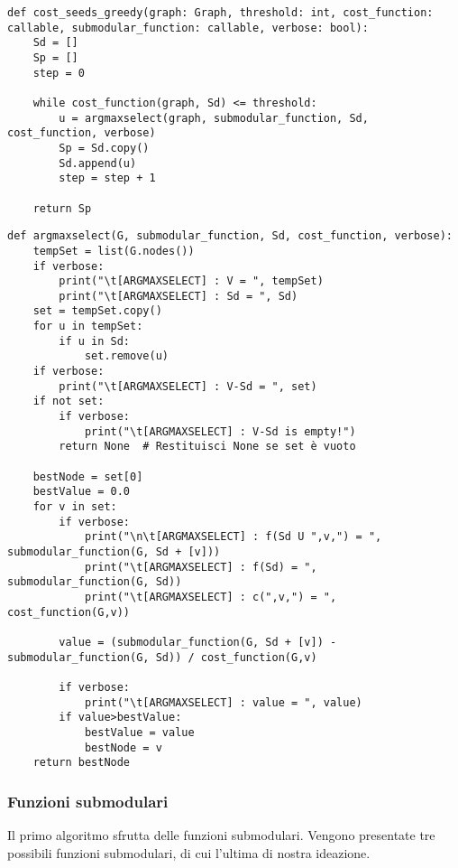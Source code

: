 \begin{code}
\begin{verbatim}
def cost_seeds_greedy(graph: Graph, threshold: int, cost_function: callable, submodular_function: callable, verbose: bool):
    Sd = []
    Sp = []
    step = 0

    while cost_function(graph, Sd) <= threshold:
        u = argmaxselect(graph, submodular_function, Sd, cost_function, verbose)
        Sp = Sd.copy()
        Sd.append(u)
        step = step + 1

    return Sp
\end{verbatim}
\end{code}

\begin{code}
\begin{verbatim}
def argmaxselect(G, submodular_function, Sd, cost_function, verbose):
    tempSet = list(G.nodes())
    if verbose:
        print("\t[ARGMAXSELECT] : V = ", tempSet)
        print("\t[ARGMAXSELECT] : Sd = ", Sd)
    set = tempSet.copy()
    for u in tempSet:
        if u in Sd:
            set.remove(u)
    if verbose:
        print("\t[ARGMAXSELECT] : V-Sd = ", set)
    if not set:
        if verbose:
            print("\t[ARGMAXSELECT] : V-Sd is empty!")
        return None  # Restituisci None se set è vuoto

    bestNode = set[0]
    bestValue = 0.0
    for v in set:
        if verbose:
            print("\n\t[ARGMAXSELECT] : f(Sd U ",v,") = ", submodular_function(G, Sd + [v]))
            print("\t[ARGMAXSELECT] : f(Sd) = ", submodular_function(G, Sd))
            print("\t[ARGMAXSELECT] : c(",v,") = ", cost_function(G,v))

        value = (submodular_function(G, Sd + [v]) - submodular_function(G, Sd)) / cost_function(G,v)

        if verbose:
            print("\t[ARGMAXSELECT] : value = ", value)
        if value>bestValue:
            bestValue = value
            bestNode = v
    return bestNode
\end{verbatim}
\end{code}

\subsubsection{Funzioni submodulari}

Il primo algoritmo sfrutta delle funzioni submodulari. Vengono presentate tre possibili funzioni submodulari, di cui l'ultima di nostra ideazione.

